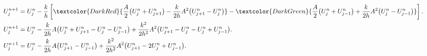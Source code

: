\begin{frame}
  \frametitle{\secname}

  \begin{proofs}
    \begin{align*}
      U^{n+1}_{j} & =
      U_{j}^{n}-
      \frac{k}{h}
      \left[
        \textcolor{DarkRed}{
          \frac{A}{2}
          \big(
          U^{n}_{j}+
          U^{n}_{j+1}
          \big)-
          \frac{k}{2h}
          A^{2}
          \big(
          U^{n}_{j+1}-
          U^{n}_{j}
          \big)}-
        \textcolor{DarkGreen}{
          \frac{A}{2}
          \big(
          U^{n}_{j}+
          U^{n}_{j-1}
          \big)+
          \frac{k}{2h}
          A^{2}
          \big(
          U^{n}_{j}-
          U^{n}_{j-1}
          \big)}
      \right].        \\
      U^{n+1}_{j} & =
      U_{j}^{n}-
      \frac{k}{2h}
      A
      \big(
      U^{n}_{j}+
      U^{n}_{j+1}-
      U^{n}_{j}-
      U^{n}_{j-1}
      \big)+
      \frac{k^{2}}{2h^{2}}
      A^{2}
      \big(
      U^{n}_{j+1}-
      U^{n}_{j}-
      U^{n}_{j}+
      U^{n}_{j-1}
      \big).          \\
      U^{n+1}_{j} & =
      U_{j}^{n}-
      \frac{k}{2h}
      A
      \big(
      U^{n}_{j+1}-
      U^{n}_{j-1}
      \big)+
      \frac{k^{2}}{2h^{2}}
      A^{2}
      \big(
      U^{n}_{j+1}-
      2U^{n}_{j}+
      U^{n}_{j-1}
      \big).
    \end{align*}
  \end{proofs}
\end{frame}



